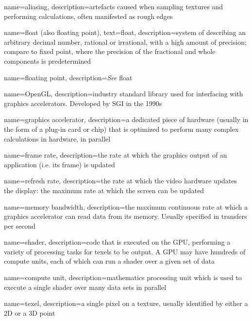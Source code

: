  {
  name=aliasing,
  description={artefacts caused when sampling textures and performing calculations, often manifested as rough edges}
}

 {
  name={float (\textmd{also} floating point)},
  text=float,
  description={system of describing an arbitrary decimal number, rational or irrational, with a high amount of precision; compare to fixed point, where the precision of the fractional and whole components is predetermined}
}

 {
	name=floating point,
	description={\emph{See} \gls{float}}
}

 {
  name=OpenGL,
  description={industry standard library used for interfacing with \glspl{graphics accelerator}. Developed by SGI in the 1990s}
}

 {
  name=graphics accelerator,
  description={a dedicated piece of hardware (usually in the form of a plug-in card or chip) that is optimized to perform many complex calculations in hardware, in parallel}
}

 {
  name=frame rate,
  description={the rate at which the graphics output of an application (i.e. its frame) is updated}
}

 {
  name=refresh rate,
  description={the rate at which the video hardware updates the display: the maximum rate at which the screen can be updated}
}

 {
  name=memory bandwidth,
  description={the maximum continuous rate at which a \gls{graphics accelerator} can read data from its memory. Usually specified in transfers per second}
}

 {
  name=shader,
  description={code that is executed on the GPU, performing a variety of processing tasks for \glspl{texel} to be output. A \gls{GPU} may have hundreds of \glspl{compute unit}, each of which can run a shader over a given set of data}
}

 {
  name=compute unit,
  description={mathematics processing unit which is used to execute a single \gls{shader} over many  data sets in parallel}
}

 {
  name=texel,
  description={a single pixel on a texture, usually identified by either a 2D or a 3D point}
}

